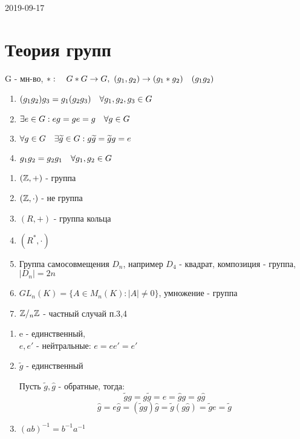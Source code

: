 \documentclass[main]{subfiles}
\begin{document}
\begin{lect}{2019-09-17}
    \section{Теория групп}

    \begin{definition}[группа]
        G - мн-во, $*: \quad G*G \rightarrow G,\ (g_1, g_2) \rightarrow (g_1*g_2)\quad (g_1g_2)$
        \begin{enumerate}
        	\item $(g_1g_2)g_3 = g_1(g_2g_3) \quad \forall g_1, g_2, g_3 \in G$
        	\item $\exists e \in G : eg = ge = g \quad \forall g \in G$
        	\item $\forall g \in G \quad \exists \widetilde{g} \in G : g\widetilde{g} = \widetilde{g}g = e$
        	\item $g_1g_2 = g_2g_1 \quad \forall g_1, g_2 \in G$
    	\end{enumerate}
    \end{definition}

    \begin{examples}
        \begin{enumerate}
            \item $(\mathbb{Z},+)$ - группа
            \item $(\mathbb{Z}, \cdot)$ - не группа
            \item $(R, +)$ - группа кольца
            \item $(R^*, \cdot)$
            \item Группа самосовмещения $D_n$, например $D_4$ - квадрат, композиция - группа, $|D_n|=2n$
            \item $GL_n(K) = \{A \in M_n(K) : |A| \neq 0\}$, умножение - группа
            \item $\mathbb{Z}/_n \mathbb{Z}$ - частный случай п.3,4
        \end{enumerate}
    \end{examples}

    \begin{theorem}
        \begin{enumerate}
            \item e - единственный, \\
                $e,e'$ - нейтральные: $e=e e'=e'$
            \item $\widetilde{g}$ - единственный

            Пусть $\widetilde{g},\hat{g}$ - обратные, тогда:
            \[\widetilde{g}g = g\widetilde{g} = e = \hat{g}g = g\hat{g}\]
            \[\hat{g}=e \hat{g}=(\widetilde{g}g)\hat{g}=\widetilde{g}(g\hat{g})=\widetilde{g}e=\widetilde{g}\]
            \item $(a b)^{-1}=b^{-1}a^{-1}$


\end{enumerate}
\end{theorem}
\end{lect}
\end{document}
